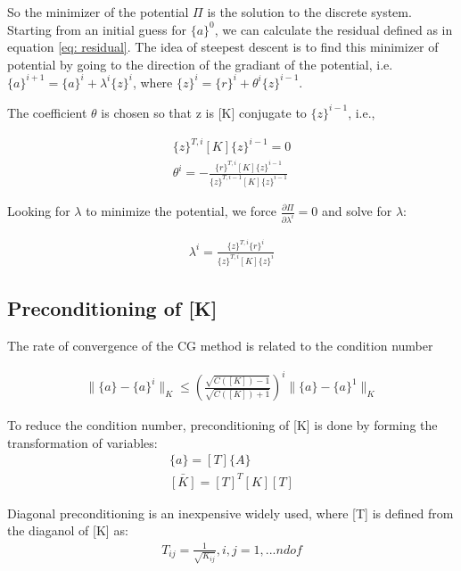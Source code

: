 \documentclass[paper=a4, fontsize=11pt]{article} %
\begin{document}
So the minimizer of the potential $\Pi$ is the solution to the discrete system. Starting from an initial guess for $\{a\}^0$, we can calculate the residual defined as in equation \ref{eq: residual}. The idea of steepest descent is to find this minimizer of potential by going to the direction of the gradiant of the potential, i.e. $\{a\} ^{i+1} = \{a\} ^i + \lambda ^i \{z\} ^i $, where $\{z\}^i = \{r\}^i + \theta ^i\{z\}^{i-1}$.

The coefficient $\theta$ is chosen so that {z} is [K] conjugate to $\{z\}^{i-1}$, i.e.,

\begin{eqnarray}
\{z\}^{T, i} [K] \{z\} ^{i-1} =0 \nonumber\\
\theta^i = - \frac{\{r\}^{T,i} [K] \{z\} ^ {i-1}} {\{z\} ^{T,i-1} [K] \{z\}^{i-1} }
\end{eqnarray}

Looking for $\lambda$ to minimize the potential, we force $\frac{\partial {\Pi}}{\partial \lambda ^i} =0 $ and solve for $\lambda$:

\begin{eqnarray}
\lambda ^i = \frac{ \{z\}^{T,i} \{r\}^i} { \{z\}^{T,i}[K]\{z\}^i}
\end{eqnarray}

\subsection{Preconditioning of [K]}
The rate of convergence of the CG method is related to the condition number

\begin{eqnarray}
\| \{a\} - \{ a\}^i \| _K \leq (\frac{ \sqrt{C([K]) -1} }{ \sqrt{C([K]) + 1} }) ^i \| \{a\} - \{a\} ^1 \| _K
\end{eqnarray}

To reduce the condition number, preconditioning of [K] is done by forming the transformation of variables:
\begin{eqnarray}
\{a\} = [T] \{ A\} \nonumber\\
\bar{[K]} = [T] ^T [K] [T] 
\end{eqnarray} 

Diagonal preconditioning is an inexpensive widely used, where [T] is defined from the diaganol of [K] as:
\begin{eqnarray}
T_{ij} = \frac{1} { \sqrt{ K_{ij} } }, i,j = 1, ... ndof 
\end{eqnarray}
\end{document}
